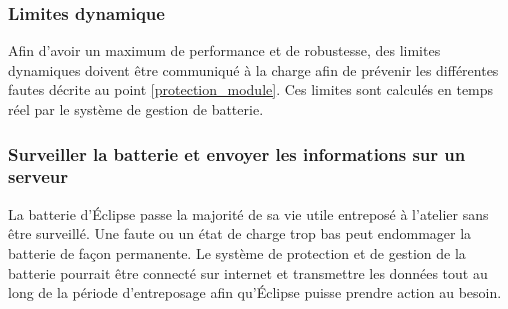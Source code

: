 	\subsubsection{Limites dynamique}
	Afin d'avoir un maximum de performance et de robustesse, des limites dynamiques doivent être communiqué à la charge afin de prévenir les différentes fautes décrite au point \ref{protection_module}. Ces limites sont calculés en temps réel par le système de gestion de batterie. 
	
	\subsubsection{Surveiller la batterie et envoyer les informations sur un serveur}
	La batterie d'Éclipse passe la majorité de sa vie utile entreposé à l'atelier sans être surveillé. Une faute ou un état de charge trop bas peut endommager la batterie de façon permanente. Le système de protection et de gestion de la batterie pourrait être connecté sur internet et transmettre les données tout au long de la période d'entreposage afin qu'Éclipse puisse prendre action au besoin.  